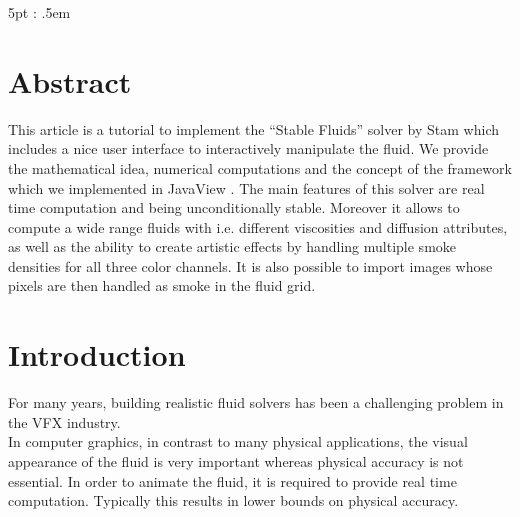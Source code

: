 \documentclass[a4paper,10pt,oneside,final,german,openbib,pdftex,titlepage]{scrbook}
\begin{document}
\mainmatter
\sloppy

    {\topsep}             %
    {5pt}             %
    {\itshape}         %
    {\parindent}       %
    {\bfseries}        %
    {:}                %
    {.5em}             %
    {}                 %

\theoremstyle{test333}
\newtheorem{test333}{TEST}
\newtheorem{thm}{Theorem}


\theoremstyle{theorem}%
\newtheorem{Lem}[thm]{Lemma}
\newtheorem{Cor}[thm]{Corollary}
\newtheorem{Def}[thm]{Definition}

\theoremstyle{definition}
\newtheorem{Rem}[thm]{Remark}



\makeatletter
\g@addto@macro{\thm@space@setup}{\thm@headpunct{:}}
\makeatother

\setcounter{chapter}{-1}
\chapter{Abstract}
This article is a tutorial to implement the ``Stable Fluids'' solver by Stam \cite{Stam} which includes a nice user interface to interactively manipulate the fluid. We provide the mathematical idea, numerical computations and the concept of the framework which we implemented in JavaView \cite{JavaView}. The main features of this solver are real time computation and being unconditionally stable. Moreover it allows to compute a wide range fluids with i.e. different viscosities and diffusion attributes, as well as the ability to create artistic effects by handling multiple smoke densities for all three color channels. It is also possible to import images whose pixels are then handled as smoke in the fluid grid.
\chapter{Introduction}

For many years, building realistic fluid solvers has been a challenging problem in the VFX industry.\\
In computer graphics, in contrast to many physical applications, the visual appearance of the fluid is very important whereas physical accuracy is not essential. In order to animate the fluid, it is required to provide real time computation. Typically this results in lower bounds on physical accuracy.\\
\end{document}
